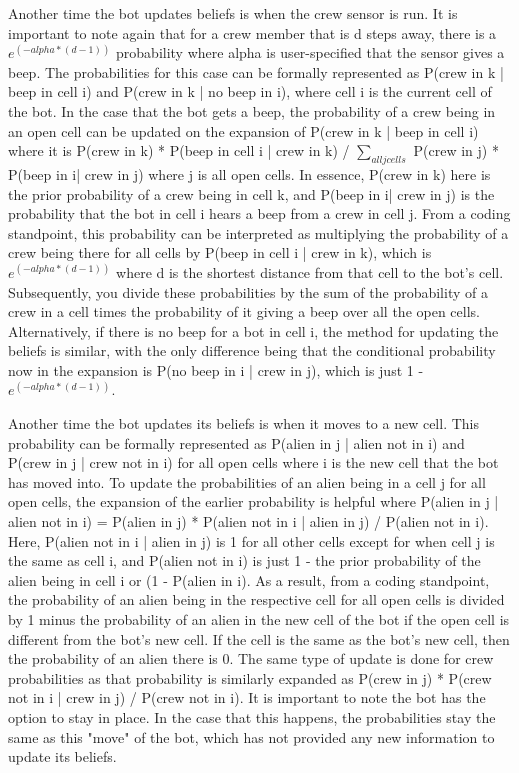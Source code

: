 \documentclass[11pt]{article}
\begin{document}
Another time the bot updates beliefs is when the crew sensor is run. It is important to note again that for a crew member that is d steps away, there is a $e^{(-alpha * (d-1))}$ probability where alpha is user-specified that the sensor gives a beep. The probabilities for this case can be formally represented as P(crew in k | beep in cell i) and P(crew in k | no beep in i), where cell i is the current cell of the bot. In the case that the bot gets a beep, the probability of a crew being in an open cell can be updated on the expansion of P(crew in k | beep in cell i) where it is P(crew in k) * P(beep in cell i | crew in k) / $\sum_{all j cells}$ P(crew in j) * P(beep in i| crew in j) where j is all open cells. In essence, P(crew in k) here is the prior probability of a crew being in cell k, and P(beep in i| crew in j) is the probability that the bot in cell i hears a beep from a crew in cell j. From a coding standpoint, this probability can be interpreted as multiplying the probability of a crew being there for all cells by P(beep in cell i | crew in k), which is $e^{(-alpha * (d-1))}$ where d is the shortest distance from that cell to the bot's cell. Subsequently, you divide these probabilities by the sum of the probability of a crew in a cell times the probability of it giving a beep over all the open cells. Alternatively, if there is no beep for a bot in cell i, the method for updating the beliefs is similar, with the only difference being that the conditional probability now in the expansion is P(no beep in i | crew in j), which is just 1 - $e^{(-alpha * (d-1))}$. 

\medskip

Another time the bot updates its beliefs is when it moves to a new cell. This probability can be formally represented as P(alien in j | alien not in i) and P(crew in j | crew not in i) for all open cells where i is the new cell that the bot has moved into. To update the probabilities of an alien being in a cell j for all open cells, the expansion of the earlier probability is helpful where P(alien in j | alien not in i) = P(alien in j) * P(alien not in i | alien in j) / P(alien not in i). Here, P(alien not in i | alien in j) is 1 for all other cells except for when cell j is the same as cell i, and P(alien not in i) is just 1 - the prior probability of the alien being in cell i or (1 - P(alien in i). As a result, from a coding standpoint, the probability of an alien being in the respective cell for all open cells is divided by 1 minus the probability of an alien in the new cell of the bot if the open cell is different from the bot's new cell. If the cell is the same as the bot's new cell, then the probability of an alien there is 0. The same type of update is done for crew probabilities as that probability is similarly expanded as P(crew in j) * P(crew not in i | crew in j) / P(crew not in i). It is important to note the bot has the option to stay in place. In the case that this happens, the probabilities stay the same as this "move" of the bot, which has not provided any new information to update its beliefs. 
\end{document}
